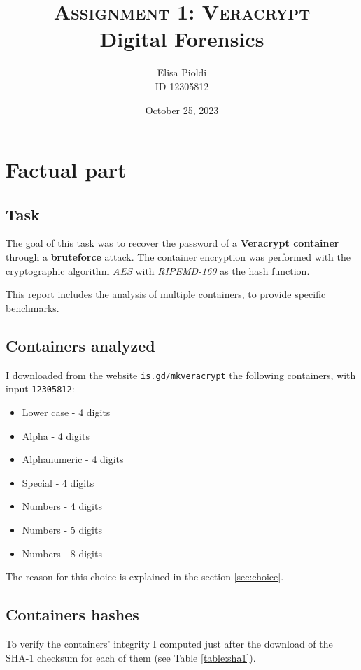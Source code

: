 \documentclass[12pt]{article}
\title{\textbf{\textsc{Assignment 1: Veracrypt}}\\Digital Forensics}
\author{Elisa Pioldi\\
        ID 12305812}
\date{October 25, 2023}
\begin{document}
\maketitle

\section{Factual part}

\subsection{Task}

The goal of this task was to recover the password of a \textbf{Veracrypt container} through a \textbf{bruteforce} attack.
The container encryption was performed with the cryptographic algorithm \textit{AES} with \textit{RIPEMD-160} as the hash function.

This report includes the analysis of multiple containers, to provide specific benchmarks.

\subsection{Containers analyzed}
\label{sec:containers}

I downloaded from the website \href{https://is.gd/mkveracrypt}{\texttt{is.gd/mkveracrypt}} the following containers, with input \texttt{12305812}:

\begin{itemize}
\item Lower case - 4 digits
\item Alpha - 4 digits
\item Alphanumeric - 4 digits
\item Special - 4 digits
\item Numbers - 4 digits
\item Numbers - 5 digits
\item Numbers - 8 digits
\end{itemize}

The reason for this choice is explained in the section \ref{sec:choice}.

\subsection{Containers hashes}

To verify the containers' integrity I computed just after the download of the SHA-1 checksum \cite{sha1} for each of them (see Table \ref{table:sha1}).
\end{document}
